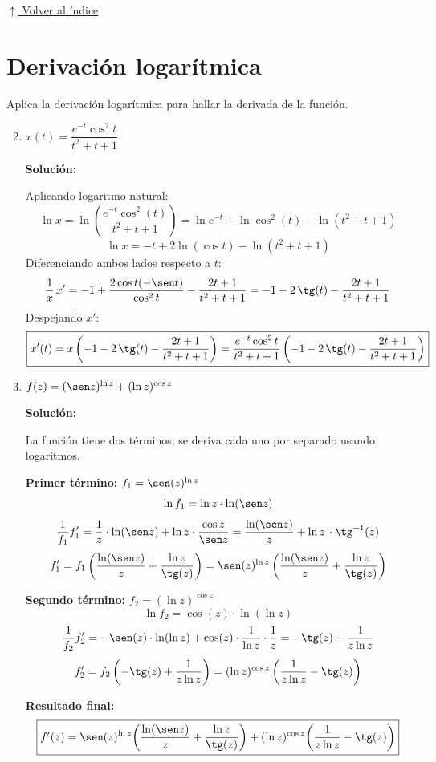 \documentclass[12pt]{article}
\newcommand{\solucion}{%
    \vspace{0.8em}%
    \textbf{Solución:}%
}
\newcommand{\volverindice}{%
    \vspace{1em}%
    \begin{flushright}%
        \hyperlink{indice}{\small $\uparrow$ Volver al índice}%
    \end{flushright}%
}
\begin{document}
\volverindice
\newpage

\section{Derivación logarítmica}

Aplica la derivación logarítmica para hallar la derivada de la función.

\begin{enumerate}[label=\alph*.-]
    \setcounter{enumi}{1} %
    \item $x(t) = \dfrac{e^{-t}\cos^2 t}{t^2 + t + 1}$

    \solucion

    Aplicando logaritmo natural:
    \[
    \ln x = \ln\left(\frac{e^{-t}\cos^2(t)}{t^2+t+1}\right)
    = \ln e^{-t} + \ln\cos^2(t) - \ln(t^2+t+1)
    \]
    \[
    \ln x = -t + 2\ln(\cos t) - \ln(t^2+t+1)
    \]
    Diferenciando ambos lados respecto a $t$:
    \[
    \frac{1}{x}\,x' = -1 + \frac{2\cos t(-\sen t)}{\cos^2 t} - \frac{2t+1}{t^2+t+1}
    = -1 - 2\,\tg(t) - \frac{2t+1}{t^2+t+1}
    \]
    Despejando $x'$:
    \[
    \boxed{x'(t) = x\left(-1 - 2\,\tg(t) - \frac{2t+1}{t^2+t+1}\right)
    = \frac{e^{-t}\cos^2 t}{t^2+t+1}\left(-1 - 2\,\tg(t) - \frac{2t+1}{t^2+t+1}\right)}
    \]

    \setcounter{enumi}{5} %
    \item $f(z) = (\sen z)^{\ln z} + (\ln z)^{\cos z}$

    \solucion

    La función tiene dos términos; se deriva cada uno por separado usando logaritmos.

    \textbf{Primer término:} $f_1 = \sen(z)^{\ln z}$
    \[
    \ln f_1 = \ln z \cdot \ln(\sen z)
    \]
    \[
    \frac{1}{f_1}f_1' = \frac{1}{z}\cdot\ln(\sen z) + \ln z \cdot \frac{\cos z}{\sen z}
    = \frac{\ln(\sen z)}{z} + \ln z\,\cdot\tg^{-1}(z)
    \]
    \[
    f_1' = f_1\left(\frac{\ln(\sen z)}{z} + \frac{\ln z}{\tg(z)}\right)
    = \sen(z)^{\ln z}\left(\frac{\ln(\sen z)}{z} + \frac{\ln z}{\tg(z)}\right)
    \]

    \textbf{Segundo término:} $f_2 = (\ln z)^{\cos z}$
    \[
    \ln f_2 = \cos(z)\cdot\ln(\ln z)
    \]
    \[
    \frac{1}{f_2}f_2' = -\sen(z)\cdot\ln(\ln z) + \cos(z)\cdot\frac{1}{\ln z}\cdot\frac{1}{z}
    = -\tg(z) + \frac{1}{z\ln z}
    \]
    \[
    f_2' = f_2\left(-\tg(z) + \frac{1}{z\ln z}\right)
    = (\ln z)^{\cos z}\left(\frac{1}{z\ln z} - \tg(z)\right)
    \]

    \textbf{Resultado final:}
    \[
    \boxed{f'(z) = \sen(z)^{\ln z}\!\left(\frac{\ln(\sen z)}{z} + \frac{\ln z}{\tg(z)}\right)
    + (\ln z)^{\cos z}\!\left(\frac{1}{z\ln z} - \tg(z)\right)}
    \]
\end{enumerate}
\end{document}
